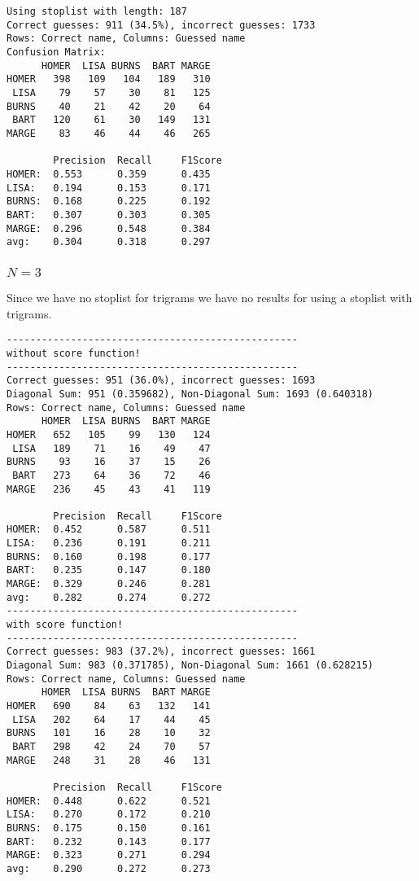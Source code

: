 \documentclass[a5paper]{article}
\begin{document}
\begin{verbatim}
Using stoplist with length: 187
Correct guesses: 911 (34.5%), incorrect guesses: 1733
Rows: Correct name, Columns: Guessed name
Confusion Matrix:
      HOMER  LISA BURNS  BART MARGE 
HOMER   398   109   104   189   310 
 LISA    79    57    30    81   125 
BURNS    40    21    42    20    64 
 BART   120    61    30   149   131 
MARGE    83    46    44    46   265 

        Precision  Recall     F1Score    
HOMER:  0.553      0.359      0.435      
LISA:   0.194      0.153      0.171      
BURNS:  0.168      0.225      0.192      
BART:   0.307      0.303      0.305      
MARGE:  0.296      0.548      0.384      
avg:    0.304      0.318      0.297      
\end{verbatim}

\subsubsection{$N=3$}
Since we have no stoplist for trigrams we have no results for using a stoplist
with trigrams.
\begin{verbatim}
--------------------------------------------------
without score function!
--------------------------------------------------
Correct guesses: 951 (36.0%), incorrect guesses: 1693
Diagonal Sum: 951 (0.359682), Non-Diagonal Sum: 1693 (0.640318)
Rows: Correct name, Columns: Guessed name
      HOMER  LISA BURNS  BART MARGE 
HOMER   652   105    99   130   124 
 LISA   189    71    16    49    47 
BURNS    93    16    37    15    26 
 BART   273    64    36    72    46 
MARGE   236    45    43    41   119 

        Precision  Recall     F1Score    
HOMER:  0.452      0.587      0.511      
LISA:   0.236      0.191      0.211      
BURNS:  0.160      0.198      0.177      
BART:   0.235      0.147      0.180      
MARGE:  0.329      0.246      0.281      
avg:    0.282      0.274      0.272      
--------------------------------------------------
with score function!
--------------------------------------------------
Correct guesses: 983 (37.2%), incorrect guesses: 1661
Diagonal Sum: 983 (0.371785), Non-Diagonal Sum: 1661 (0.628215)
Rows: Correct name, Columns: Guessed name
      HOMER  LISA BURNS  BART MARGE 
HOMER   690    84    63   132   141 
 LISA   202    64    17    44    45 
BURNS   101    16    28    10    32 
 BART   298    42    24    70    57 
MARGE   248    31    28    46   131 

        Precision  Recall     F1Score    
HOMER:  0.448      0.622      0.521      
LISA:   0.270      0.172      0.210      
BURNS:  0.175      0.150      0.161      
BART:   0.232      0.143      0.177      
MARGE:  0.323      0.271      0.294      
avg:    0.290      0.272      0.273      
\end{verbatim}
\end{document}
